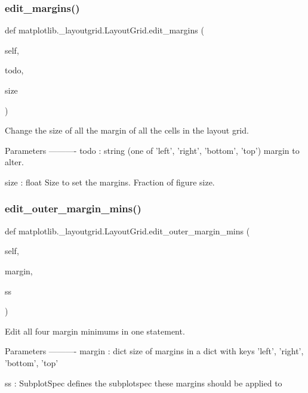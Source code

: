 \subsubsection{\texorpdfstring{edit\+\_\+margins()}{edit\_margins()}}
{\footnotesize\ttfamily def matplotlib.\+\_\+layoutgrid.\+Layout\+Grid.\+edit\+\_\+margins (\begin{DoxyParamCaption}\item[{}]{self,  }\item[{}]{todo,  }\item[{}]{size }\end{DoxyParamCaption})}

\begin{DoxyVerb}Change the size of all the margin of all the cells in the layout grid.

Parameters
----------
todo : string (one of 'left', 'right', 'bottom', 'top')
    margin to alter.

size : float
    Size to set the margins.  Fraction of figure size.
\end{DoxyVerb}
 \mbox{\label{classmatplotlib_1_1__layoutgrid_1_1LayoutGrid_a2f48a12036b553c46df46411bb217441}} 
\subsubsection{\texorpdfstring{edit\+\_\+outer\+\_\+margin\+\_\+mins()}{edit\_outer\_margin\_mins()}}
{\footnotesize\ttfamily def matplotlib.\+\_\+layoutgrid.\+Layout\+Grid.\+edit\+\_\+outer\+\_\+margin\+\_\+mins (\begin{DoxyParamCaption}\item[{}]{self,  }\item[{}]{margin,  }\item[{}]{ss }\end{DoxyParamCaption})}

\begin{DoxyVerb}Edit all four margin minimums in one statement.

Parameters
----------
margin : dict
    size of margins in a dict with keys 'left', 'right', 'bottom',
    'top'

ss : SubplotSpec
    defines the subplotspec these margins should be applied to
\end{DoxyVerb}
 \mbox{\label{classmatplotlib_1_1__layoutgrid_1_1LayoutGrid_abd495d13221a992f867c4a1c62e5dcc3}} 
